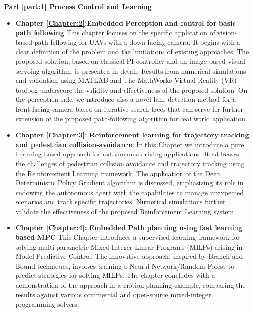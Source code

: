 \textbf{Part \textcolor{red}{\ref{part:1}} Process Control and Learning}
\begin{itemize}
    \item \textbf{Chapter \textcolor{red}{\ref{Chapter:2}}:Embedded Perception and
control for basic path following }
This chapter focuses on the specific application of vision-based path following for UAVs with a down-facing camera. It begins with a clear definition of the problem and the limitations of existing approaches. The proposed solution, based on classical PI controller and an image-based visual servoing algorithm, is presented in detail. Results from numerical simulations and validation using MATLAB and The MathWorks Virtual Reality (VR) toolbox underscore the validity and effectiveness of the proposed solution. On the perception side, we introduce also a novel lane detection method for a front-facing camera based on iterative-search trees that can serve for further extension of the proposed path-following algorithm for real world application.
\item \textbf{Chapter \textcolor{red}{\ref{Chapter:3}}: Reinforcement learning for trajectory tracking and pedestrian collision-avoidance}: In this Chapter we introduce a pure Learning-based approach for autonomous driving applications. It addresses the challenges of pedestrian collision avoidance and trajectory tracking using the Reinforcement Learning framework. The application of the Deep Deterministic Policy Gradient algorithm is discussed, emphasizing its role in endowing the autonomous agent with the capabilities to manage unexpected scenarios and track specific trajectories. Numerical simulations further validate the effectiveness of the proposed Reinforcement Learning system.
\item \textbf{Chapter \textcolor{red}{\ref{Chapter:4}}: Embedded Path planning using fast learning based MPC } This Chapter introduces a supervised learning framework for solving multi-parametric Mixed Integer Linear Programs (MILPs) arising in Model Predictive Control. The innovative approach, inspired by Branch-and-Bound techniques, involves training a Neural Network/Random Forest to predict strategies for solving MILPs. The chapter concludes with a demonstration of the approach in a motion planning example, comparing the results against various commercial and open-source mixed-integer programming solvers.

\end{itemize}



